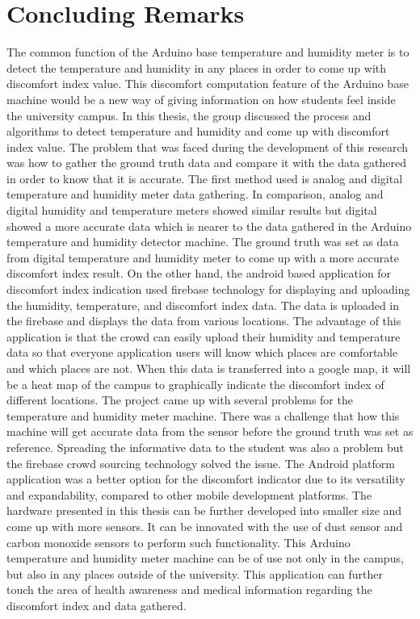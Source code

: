\section{Concluding Remarks}

The common function of the Arduino base temperature and humidity meter is to detect the temperature and humidity in any places in order to come up with discomfort index value.  This discomfort computation feature of the Arduino base machine would be a new way of giving information on how students feel inside the university campus.
In this thesis, the group discussed the process and algorithms to detect temperature and humidity and come up with discomfort index value.  The problem that was faced during the development of this research was how to gather the ground truth data and compare it with the data gathered in order to know that it is accurate.  The first method used is analog and digital temperature and humidity meter data gathering.  In comparison, analog and digital humidity and temperature meters showed similar results but digital showed a more accurate data which is nearer to the data gathered in the Arduino temperature and humidity detector machine.  The ground truth was set as data from digital temperature and humidity meter to come up with a more accurate discomfort index result.  On the other hand, the android based application for discomfort index indication used firebase technology for displaying and uploading the humidity, temperature, and discomfort index data.  The data is uploaded in the firebase and displays the data from various locations.  The advantage of this application is that the crowd can easily upload their humidity and temperature data so that everyone application users will know which places are comfortable and which places are not. When this data is transferred into a google map, it will be a heat map of the campus to graphically indicate the discomfort index of different locations.
The project came up with several problems for the temperature and humidity meter machine. There was a challenge that how this machine will get accurate data from the sensor before the ground truth was set as reference. Spreading the informative data to the student was also a problem but the firebase crowd sourcing technology solved the issue. The Android platform application was a better option for the discomfort indicator due to its versatility and expandability, compared to other mobile development platforms.
The hardware presented in this thesis can be further developed into smaller size and come up with more sensors. It can be innovated with the use of dust sensor and carbon monoxide sensors to perform such functionality. This Arduino temperature and humidity meter machine can be of use not only in the campus, but also in any places outside of the university. This application can further touch the area of health awareness and medical information regarding the discomfort index and data gathered.



